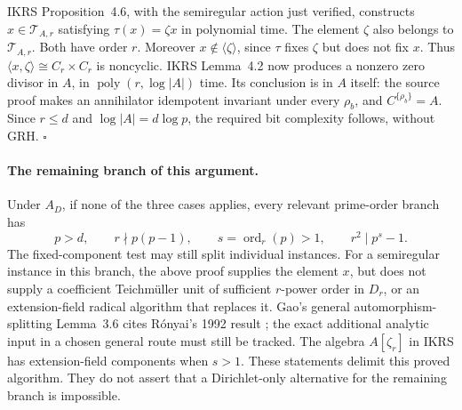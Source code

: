 IKRS Proposition~4.6, with the semiregular action just verified,
constructs \(x\in\mathcal T_{A,r}\) satisfying
\(\tau(x)=\zeta x\) in polynomial time.
The element \(\zeta\) also belongs to \(\mathcal T_{A,r}\).
Both have order \(r\).
Moreover \(x\notin\langle\zeta\rangle\), since \(\tau\) fixes
\(\zeta\) but does not fix \(x\).
Thus \(\langle x,\zeta\rangle\cong C_r\times C_r\) is noncyclic.
IKRS Lemma~4.2 now produces a nonzero zero divisor in
\(A\), in \(\operatorname{poly}(r,\log|A|)\) time.
Its conclusion is in \(A\) itself: the source proof makes an
annihilator idempotent invariant under every \(\rho_b\), and
\(C^{\{\rho_b\}}=A\).
Since \(r\leq d\) and \(\log|A|=d\log p\), the required bit
complexity follows, without GRH.
\hfill\(\square\)

\paragraph{The remaining branch of this argument.}
Under \(A_D\), if none of the three cases applies, every relevant
prime-order branch has
\[
 p>d,\qquad
 r\nmid p(p-1),\qquad
 s=\operatorname{ord}_r(p)>1,\qquad
 r^2\mid p^s-1.
\]
The fixed-component test may still split individual instances.
For a semiregular instance in this branch, the above proof supplies
the element \(x\), but does not supply a coefficient
Teichm\"uller unit of sufficient \(r\)-power order in \(D_r\),
or an extension-field radical algorithm that replaces it.
Gao's general automorphism-splitting Lemma~3.6 cites
R\'onyai's 1992 result
\cite[Lemma~3.6, author p.16]{CXNGao01};
the exact additional analytic input in a chosen general route
must still be tracked.
The algebra \(A[\zeta_r]\) in IKRS has extension-field components
when \(s>1\).
These statements delimit this proved algorithm.
They do not assert that a Dirichlet-only alternative for the
remaining branch is impossible.

